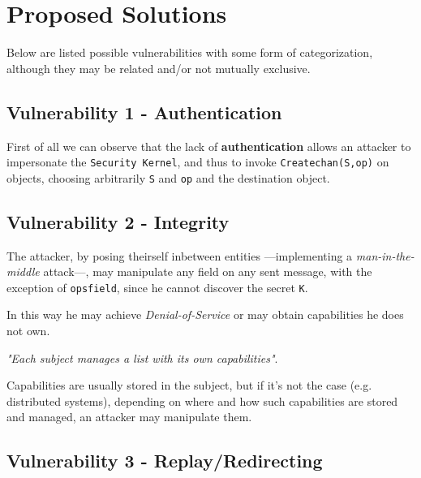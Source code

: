 \section{Proposed Solutions}
Below are listed possible vulnerabilities with some form of categorization,
although they may be related and/or not mutually exclusive.


\subsection{Vulnerability 1 - Authentication}

First of all we can observe that the lack of \textbf{authentication} allows an attacker to impersonate the \texttt{Security Kernel},
and thus to invoke \texttt{Createchan(S,op)} on objects, choosing arbitrarily \texttt{S} and \texttt{op} and the destination object.


\subsection{Vulnerability 2 - Integrity}
The attacker, by posing theirself inbetween entities {---}implementing a \textit{man-in-the-middle} attack{---},
may manipulate any field on any sent message,
with the exception of \texttt{opsfield}, since he cannot discover the secret \texttt{K}.

In this way he may achieve \textit{Denial-of-Service} or may obtain capabilities he does not own.
\nl

\begin{center}
   \textit{"Each subject manages a list with its own capabilities"}.
\end{center}
Capabilities are usually stored in the subject,
but if it's not the case (e.g. distributed systems), depending on where and how such capabilities are stored and managed,
an attacker may manipulate them.

\subsection{Vulnerability 3 - Replay/Redirecting}

